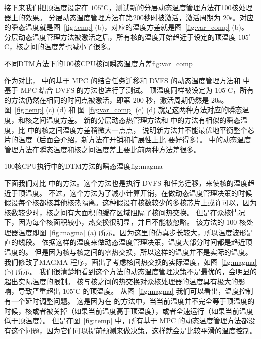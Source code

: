 接下来我们把顶温度设定在 $105^{\circ}$C，测试新的分层动态温度管理方法在100核处理器上的效果。
分层动态温度管理方法在第200秒时被激活，激活周期为 $20$s。对应的瞬态温度就是图~\ref{fig:temp} (b)，对应的温度方差就是图~\ref{fig:var_comp} (b)。
分层动态温度管理方法被激活之后，所有核的温度开始趋近于设定的顶温度 $105^{\circ}$C，核之间的温度差也减小了很多。

\begin{pics}[H]{不同DTM方法下的100核CPU核间瞬态温度方差}{fig:var_comp}
 \end{pics}
 
作为对比， \cite{MaWang:APCCAS'14} 中的基于 MPC 的结合任务迁移和 DVFS 的动态温度管理方法和 \cite{Zanini:ECCTD'09} 中基于 MPC 结合 DVFS 的方法也进行了测试。
顶温度同样被设定为 $105^{\circ}$C，所有的方法仍然在相同的时间点被激活，即第 200 秒，激活周期仍然是 $20$s。
图~\ref{fig:temp} (c) (d) 和 图~\ref{fig:var_comp} (c) (d) 就是这两种方法对应的瞬态温度，和核之间温度方差。
新的分层动态热管理方法和 \cite{MaWang:APCCAS'14} 中的方法有相似的瞬态温度，比 \cite{MaWang:APCCAS'14} 中的核之间温度方差稍微大一点点，
说明新方法并不能最优地平衡整个芯片的温度（后面会介绍，新方法在开销和扩展性上比 \cite{MaWang:APCCAS'14} 要好得多）。
\cite{Zanini:ECCTD'09} 中的动态温度管理方法在瞬态温度和核之间温度差上要比前两种方法差很多。

\begin{pics}{100核CPU执行\cite{Hanumaiah:TCAD'11}中的DTM方法的瞬态温度}{fig:magma}
 \end{pics}
下面我们对比 \cite{Hanumaiah:TCAD'11} 中的方法。这个方法也是执行 DVFS 和任务迁移，来使核的温度趋近于顶温度。
不过，这个方法为了减小计算开销，在做动态温度管理决策的时候假设每个核都核其他核热隔离。这种假设在核数较少的多核芯片上或许可以，因为核数较少时，核之间有大面积的缓存区域阻隔了核间热交换。
但是在众核情况下，因为每个核面积较小，热交换很明显，并且不能被忽略。
该方法的 100 核处理器温度即图~\ref{fig:magma} (a) 所示。因为这里的仿真步长较大，所以温度波形是直的线段。
依据这样的温度来做动态温度管理决策，温度大部分时间都是趋近顶温度的。
但是因为核与核之间的零热交换，所以这样的温度并不是实际的温度。
我们修改了MAGMA 程序，画出了考虑核间热交换的实际温度，如图~\ref{fig:magma} (b) 所示。
我们很清楚地看到这个方法的动态温度管理决策不是最优的，会明显的超出实际温度的限制。
核与核之间的热交换对众核处理器的温度具有极大的影响，导致严重超出 $105^{\circ}$C 的顶温度。
从图~\ref{fig:magma} 我们可以看出，温度控制有一个延时调整问题。
这是因为在 \cite{Hanumaiah:TCAD'11} 的方法中，当当前温度并不完全等于顶温度的时候，核或者被关掉（如果当前温度高于顶温度），或者全速运行（如果当前温度低于顶温度）。
但是在图~\ref{fig:temp} 中，所有基于 MPC 的动态温度管理方法都没有这个问题，因为它们可以提前预测来做决策，这样就会是比较平滑的温度控制。


